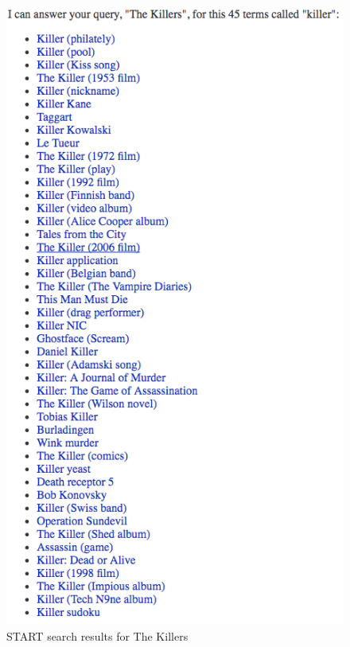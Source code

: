 \documentclass[10pt,letterpaper,bibliography=totoc]{scrartcl}
\begin{document}
\begin{figure}[h!]
\centering
\label{fig:start-killers}
\includegraphics[scale=.5]{start-killers.png}
\caption{START search results for The Killers}
\end{figure}
\end{document}
